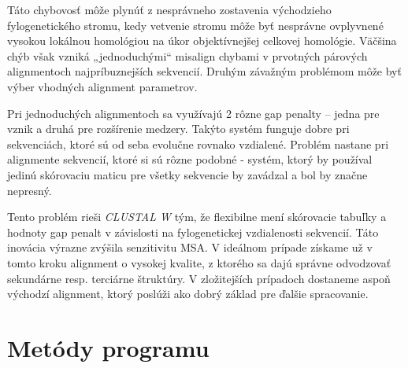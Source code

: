 \documentclass[nobib]{tufte-handout}
\newcommand{\tg}[1]{}%
\newcommand{\tr}[1]{}%
\newcommand{\tb}[1]{#1}%
\begin{document}
Táto chybovosť môže plynúť\tr{jak} z nesprávneho zostavenia východzieho fylogenetického stromu, kedy vetvenie stromu môže byť nesprávne ovplyvnené vysokou lokálnou homológiou na úkor objektívnejšej celkovej homológie\tb{. Väčšina chýb však vzniká „jednoduchými“ misalign chybami v}\tr{; ale hlavne} prvotných párových alignmentoch najpríbuznejších sekvencií. Druhým závažným problémom môže byť výber vhodných alignment parametrov. 


Pri jednoduchých alignmentoch sa \tr{kladie dôraz na počet zhod a}využívajú\tr{sa} 2 rôzne gap penalty – jedna pre vznik 
a druhá pre rozšírenie medzery. 
Takýto systém funguje dobre pri \tb{sekvenciách, ktoré sú od seba evolučne rovnako vzdialené. Problém nastane pri alignmente sekvencií, ktoré si sú rôzne podobné - systém, ktorý by používal jedinú skórovaciu maticu pre všetky sekvencie}\tr{evolučne príbuzných sekvenciách. Problém nastane pri alignmente vzdialenejších sekvencií, kde je väčší podiel medzier než zhod - predošlý skórovací systém}\tg{note: systém nezavádza, lebo skorovacie tabulky nefunguju pre vzialenejsie sekvencie, ale preto, ze rozne dvojice sekvencii naju roznu fylog. vzdialenost, teda sa neda pouzit jedina skorovacia tabulka} by zavádzal a bol by značne nepresný.

Tento problém rieši \emph{CLUSTAL W} tým, že flexibilne mení skórovacie tabuľky a hodnoty gap penalt v závislosti na fylogenetickej vzdialenosti sekvencií\tr{, teda rôznym sekvenčným maticiam prisudzuje rôznu váhu a na základe toho mení skórovací systém. Presne táto}\tb{. Táto} inovácia výrazne zvýšila senzitivitu MSA. V ideálnom prípade získame už v tomto kroku alignment o vysokej kvalite, z ktorého sa dajú správne odvodzovať sekundárne resp. terciárne štruktúry. V zložitejších prípadoch dostaneme aspoň východzí alignment, ktorý poslúži ako \tr{dobrá matrica}\tb{dobrý základ} pre ďalšie spracovanie.


\section{\textbf{Metódy programu}}\label{sec:methods}
\end{document}
